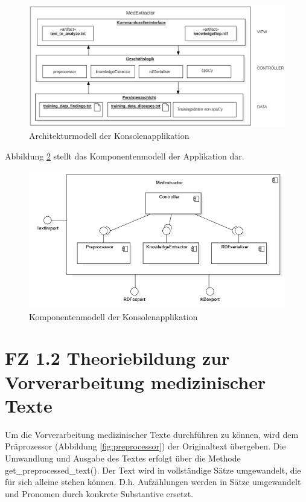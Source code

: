 \begin{figure}[h]
    \centering
    \includegraphics[width=\textwidth]{pictures/Architekturmodell.png}
    \caption{Architekturmodell der Konsolenapplikation}
    \label{fig:architekturmodell}
\end{figure}

Abbildung \ref{fig:komponentendiagramm} stellt das Komponentenmodell der Applikation dar.

\begin{figure}[h]
    \centering
    \includegraphics[width=\textwidth]{pictures/ComponentDiagram.png}
    \caption{Komponentenmodell der Konsolenapplikation}
    \label{fig:komponentendiagramm}
\end{figure}


\section{FZ 1.2 Theoriebildung zur Vorverarbeitung medizinischer Texte}
\label{sec:FZ1.2} 

Um die Vorverarbeitung medizinischer Texte durchführen zu können, wird dem Präprozessor (Abbildung \ref{fig:preprocessor}) der Originaltext übergeben. Die Umwandlung und Ausgabe des Textes erfolgt über die Methode get\_preprocessed\_text(). Der Text wird in vollständige Sätze umgewandelt, die für sich alleine stehen können. D.h. Aufzählungen werden in Sätze umgewandelt und Pronomen durch konkrete Substantive ersetzt. 

